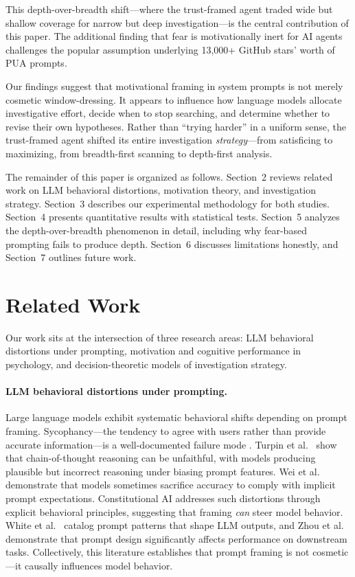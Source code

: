 \documentclass[11pt]{article}
\begin{document}
This depth-over-breadth shift---where the trust-framed agent traded wide but shallow coverage for narrow but deep investigation---is the central contribution of this paper. The additional finding that fear is motivationally inert for AI agents challenges the popular assumption underlying 13{,}000+ GitHub stars' worth of PUA prompts.

Our findings suggest that motivational framing in system prompts is not merely cosmetic window-dressing. It appears to influence how language models allocate investigative effort, decide when to stop searching, and determine whether to revise their own hypotheses. Rather than ``trying harder'' in a uniform sense, the trust-framed agent shifted its entire investigation \emph{strategy}---from satisficing \cite{simon1956rational} to maximizing, from breadth-first scanning to depth-first analysis.

The remainder of this paper is organized as follows. Section~2 reviews related work on LLM behavioral distortions, motivation theory, and investigation strategy. Section~3 describes our experimental methodology for both studies. Section~4 presents quantitative results with statistical tests. Section~5 analyzes the depth-over-breadth phenomenon in detail, including why fear-based prompting fails to produce depth. Section~6 discusses limitations honestly, and Section~7 outlines future work.

\section{Related Work}

Our work sits at the intersection of three research areas: LLM behavioral distortions under prompting, motivation and cognitive performance in psychology, and decision-theoretic models of investigation strategy.

\paragraph{LLM behavioral distortions under prompting.}
Large language models exhibit systematic behavioral shifts depending on prompt framing. Sycophancy---the tendency to agree with users rather than provide accurate information---is a well-documented failure mode \cite{sharma2023sycophancy}. Turpin et al.\ \cite{turpin2023unfaithful} show that chain-of-thought reasoning can be unfaithful, with models producing plausible but incorrect reasoning under biasing prompt features. Wei et al.\ \cite{wei2024instruction} demonstrate that models sometimes sacrifice accuracy to comply with implicit prompt expectations. Constitutional AI \cite{bai2022constitutional} addresses such distortions through explicit behavioral principles, suggesting that framing \emph{can} steer model behavior. White et al.\ \cite{white2023prompt} catalog prompt patterns that shape LLM outputs, and Zhou et al.\ \cite{zhou2023large} demonstrate that prompt design significantly affects performance on downstream tasks. Collectively, this literature establishes that prompt framing is not cosmetic---it causally influences model behavior.
\end{document}
